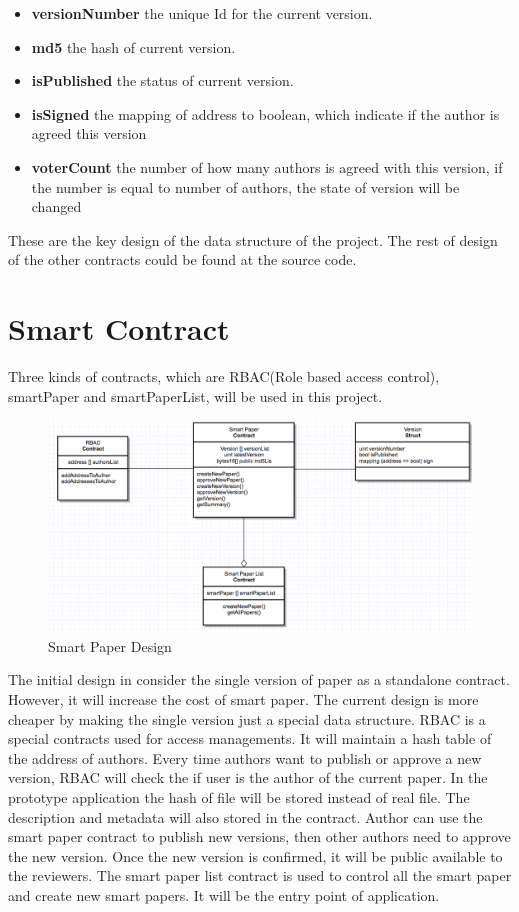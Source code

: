 \documentclass[openany,12pt]{ecsthesis}      %
\begin{document}
\begin{itemize}
  \item \textbf{versionNumber} the unique Id for the current version.
  \item \textbf{md5} the hash of current version.
  \item \textbf{isPublished} the status of current version.
  \item \textbf{isSigned} the mapping of address to boolean, which indicate if the author is agreed this version
  \item \textbf{voterCount} the number of how many authors is agreed with this version, if the number is equal to number of authors, the state of version will be changed
\end{itemize}
These are the key design of the data structure of the project. The rest of design of the other contracts could be found at the source code.
\section{Smart Contract}
Three kinds of contracts, 
which are RBAC(Role based access control), smartPaper and smartPaperList, 
will be used in this project.
\begin{figure}[H]
  \centering
  \includegraphics[width=1.0\textwidth]{uml.png}
  \caption{Smart Paper Design}
  \label{uml} 
\end{figure}
The initial design in \cite{Khoe:1994:CML:2288694.2294265} consider the single version of paper as a standalone contract.
However, it will increase the cost of smart paper. The current design is more cheaper by making the single version just a special data structure.
RBAC is a special contracts used for access managements. It will maintain a hash table of the address of authors. 
Every time authors want to publish or approve a new version, 
RBAC will check the if user is the author of the current paper. 
In the prototype application the hash of file will be stored instead of real file. The description and metadata will also stored in the contract.
Author can use the smart paper contract to publish new versions, then other authors need to approve the new version.
Once the new version is confirmed, 
it will be public available to the reviewers.  
The smart paper list contract is used to control all the smart paper and create new smart papers. 
It will be the entry point of application.
\end{document}
